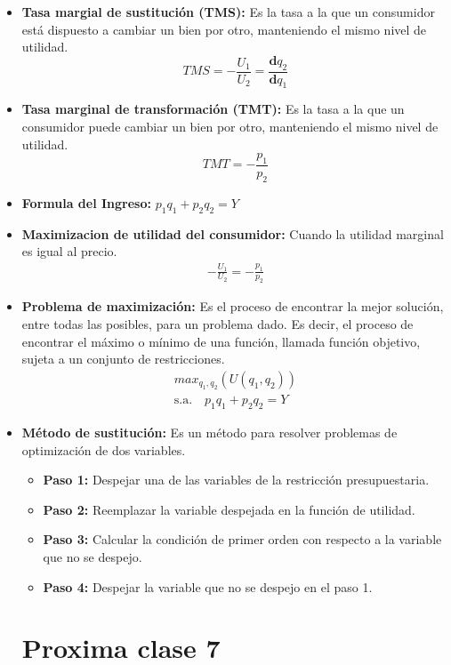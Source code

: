 \documentclass{templateNote}
\begin{document}
\begin{itemize}
    \item \textbf{Tasa margial de sustitución (TMS):} Es la tasa a la que un consumidor está dispuesto a cambiar un bien por otro, manteniendo el mismo nivel de utilidad.\\
    \begin{equation*}
        TMS =- \frac{U_1}{U_2} = \frac{\mathbf{d} q_2}{\mathbf{d} q_1}
    \end{equation*}

    \item \textbf{Tasa marginal de transformación (TMT):} Es la tasa a la que un consumidor puede cambiar un bien por otro, manteniendo el mismo nivel de utilidad.\\
    \begin{equation*}
        TMT =- \frac{p_1}{p_2}
    \end{equation*}

    \item \textbf{Formula del Ingreso:} $p_1 q_1 + p_2 q_2 = Y$
    
    \item \textbf{Maximizacion de utilidad del consumidor:} Cuando la utilidad marginal es igual al precio.
    \begin{align*}
        - \frac{U_1}{U_2} = - \frac{p_1}{p_2}
    \end{align*}
    
    \item \textbf{Problema de maximización:} Es el proceso de encontrar la mejor solución, entre todas las posibles, para un problema dado. Es decir, el proceso de encontrar el máximo o mínimo de una función, llamada función objetivo, sujeta a un conjunto de restricciones.
    \begin{align*}
        max_{q_1, q_2} (U(q_1,q_2)) \\
        \text{s.a.} \quad p_1 q_1 + p_2 q_2 = Y
    \end{align*}
    
    \item \textbf{Método de sustitución:} Es un método para resolver problemas de optimización de dos variables.\\
    \begin{itemize}
        \item \textbf{Paso 1:} Despejar una de las variables de la restricción presupuestaria.
        \item \textbf{Paso 2:} Reemplazar la variable despejada en la función de utilidad.
        \item \textbf{Paso 3:} Calcular la condición de primer orden con respecto a la variable que no se despejo.
        \item \textbf{Paso 4:} Despejar la variable que no se despejo en el paso 1.
    \end{itemize}
    \section*{Proxima clase 7}
\end{itemize}
\end{document}
